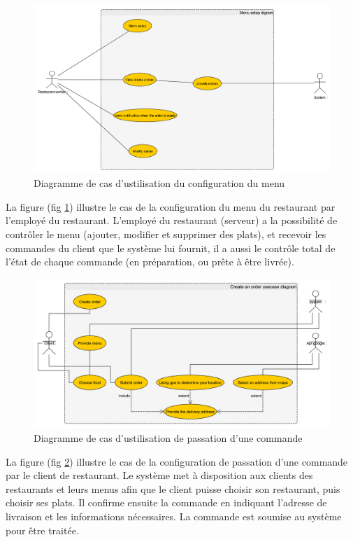 \documentclass[french, a4paper, 12pt]{report}
\begin{document}
			\begin{figure}[!h]
  				\center
  				\includegraphics[width=15cm]{usecasemenu.png}
  				\caption{Diagramme de cas d'ustilisation du configuration du menu}
  				\label{fig:usecasemenu}
			\end{figure}
			
			La figure (fig \ref{fig:usecasemenu}) illustre le cas de la configuration du menu du restaurant par l'employé du restaurant. L'employé du restaurant (serveur) a la possibilité de contrôler
le menu (ajouter, modifier et supprimer des plats), et recevoir les commandes du client que le système lui fournit,
il a aussi le contrôle total de l'état de chaque commande (en préparation, ou prête à être livrée).
			
			\newpage
			\begin{figure}[!h]
  				\center
  				\includegraphics[width=15cm]{usecaseorder.png}
  				\caption{Diagramme de cas d'ustilisation de passation d'une commande}
  				\label{fig:usecaseorder}
			\end{figure}
			La figure (fig \ref{fig:usecaseorder}) illustre le cas de la configuration de passation d'une commande par le client de restaurant. Le système met à disposition aux clients des restaurants et leurs menus afin que le client puisse choisir son restaurant,
puis choisir ses plats. Il confirme ensuite la commande en indiquant l'adresse de livraison et les informations nécessaires. La commande est soumise au système pour être traitée.
			
\end{document}
